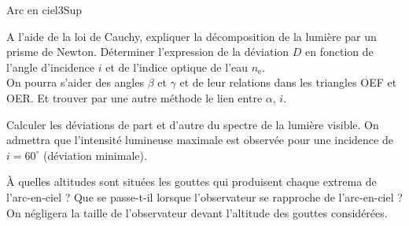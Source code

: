 \begin{exercise}{Arc en ciel}{3}{Sup}
\begin{questions}
    \questioncours A l'aide de la loi de Cauchy, expliquer la décomposition de la lumière par un prisme de Newton.
    \question Déterminer l'expression de la déviation $D$ en fonction de l'angle d'incidence $i$ et de l'indice optique de l'eau $n_\text{e}$. \\ On pourra s'aider des angles $\beta$ et $\gamma$ et de leur relations dans les triangles OEF et OER. Et trouver par une autre méthode le lien entre $\alpha$, $i$.
    
    \question Calculer les déviations de part et d'autre du spectre de la lumière visible. On admettra que l'intensité lumineuse maximale est observée pour une incidence de $i = 60^\circ$ (déviation minimale). 
    
    
    \question À quelles altitudes sont situées les gouttes qui produisent chaque extrema de l'arc-en-ciel ?  Que se passe-t-il lorsque l'observateur se rapproche de l'arc-en-ciel ? \\
    On négligera la taille de l'observateur devant l'altitude des gouttes considérées. 
\end{questions}

\end{exercise}
